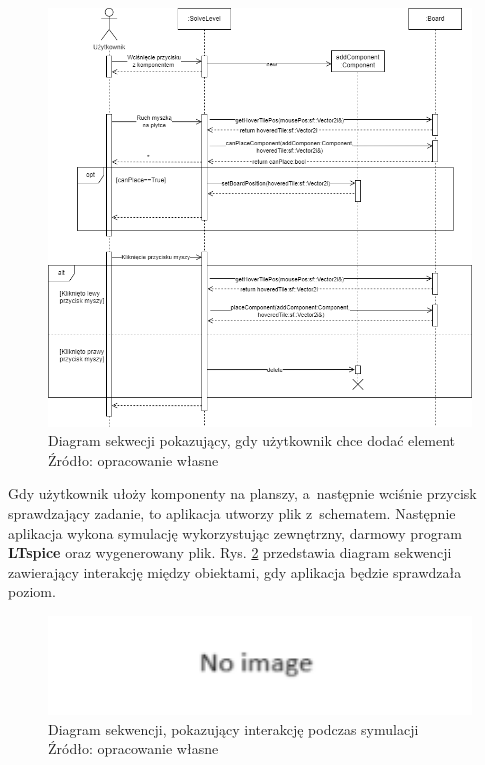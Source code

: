\documentclass[12pt,a4paper]{article} %
\begin{document}
\begin{figure}[h]
	\centering
	\includegraphics[width=15cm]{images/sequence_add_component.png}
	\caption{Diagram sekwecji pokazujący, gdy użytkownik chce dodać element \\ Źródło: opracowanie własne}
	\label{rys:sequence_add_component}
\end{figure}

\aka Gdy użytkownik ułoży komponenty na planszy, a~następnie wciśnie przycisk sprawdzający zadanie, to aplikacja utworzy plik z~schematem. Następnie aplikacja wykona symulację wykorzystując zewnętrzny, darmowy program \textbf{LTspice} oraz wygenerowany plik.
Rys. \ref{rys:diagrma_sekwencji_symulacji} przedstawia diagram sekwencji zawierający interakcję między obiektami, gdy aplikacja będzie sprawdzała poziom.

\begin{figure}[h]
	\centering
	\includegraphics[width=15cm]{images/no_image.png}
	\caption{Diagram sekwencji, pokazujący interakcję podczas symulacji \\ Źródło: opracowanie własne}
	\label{rys:diagrma_sekwencji_symulacji}
\end{figure} 
\end{document}
